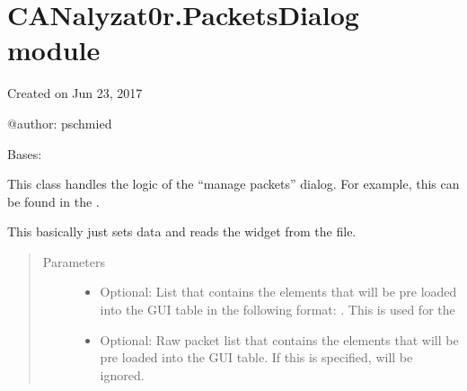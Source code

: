 \documentclass[letterpaper,10pt,english]{sphinxmanual}
\begin{document}
\section{CANalyzat0r.PacketsDialog module}
\label{\detokenize{src:module-src.PacketsDialog}}\label{\detokenize{src:canalyzat0r-packetsdialog-module}}
Created on Jun 23, 2017

@author: pschmied

\begin{fulllineitems}
\label{\detokenize{src:src.PacketsDialog.PacketsDialog}}
Bases: {\hyperref[\detokenize{src:src.AbstractTab.AbstractTab}]{}}

This class handles the logic of the “manage packets” dialog. For example, this can be found in the
{\hyperref[\detokenize{src:src.SnifferTabElement.SnifferTabElement}]{}}.

\begin{fulllineitems}
\label{\detokenize{src:src.PacketsDialog.PacketsDialog.__init__}}
This basically just sets data and reads the widget from the  file.
\begin{quote}\begin{description}
\item[{Parameters}] \leavevmode\begin{itemize}
\item {} 
 \textendash{} Optional: List that contains the elements that will be pre loaded into the GUI table
in the following format: .
This is used for the {\hyperref[\detokenize{src:src.SnifferTabElement.SnifferTabElement}]{}}

\item {} 
 \textendash{} Optional: Raw packet list that contains the elements that will be pre loaded into the GUI table.
If this is specified,  will be ignored.


\end{itemize}
\end{description}
\end{quote}
\end{fulllineitems}
\end{fulllineitems}
\end{document}
